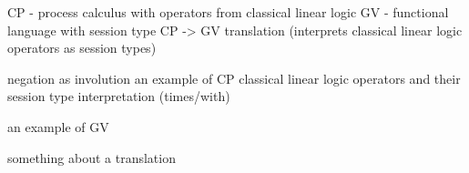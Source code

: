 \documentclass{beamer}
\begin{document}
\begin{frame}
CP - process calculus with operators from classical linear logic
GV - functional language with session type
CP -> GV translation (interprets classical linear logic operators as session
types)
\end{frame}

\begin{comment}
the formalisation i present here is an encoding of a system in the Coq proof
assistant. it is based on a two-tier system providing a logical foundation for
understanding session types. A high-level overview of the system is as
follows: we have a process calculus CP with operators from classical linear
logic, a high-level functional language GV with session types, and a
translation from GV to CP which interprets operators in classical linear logic
as session types.
\end{comment}

\begin{frame}
negation as involution
an example of CP classical linear logic operators and their session type
interpretation (times/with)
\end{frame}

\begin{comment}
by classical linear logic i mean a logic where negation is an involution which
restricts the use of certain rules on resources, namely that all linear
resources must be used (corresponding to prohibiting weakening) and that one
cannot duplicate a linear resource (corresponding to contraction). some typing
rules for the CP calculus are presented as they appear in the Coq encoding
(note that they are very similar to their informal counterparts). the
interpretation of tensor product is output of A and continue as B. The dual of
this is input of A and continue as the negation of B. Thus negation in
classical linear logic corresponds to session duality.
\end{comment}

\begin{frame}
an example of GV
\end{frame}

\begin{comment}
GV has built-in support for session types. consider the rule for sending a
value of type T along a channel N of type !T.S.
\end{comment}

\begin{frame}
something about a translation
\end{frame}
\end{document}
